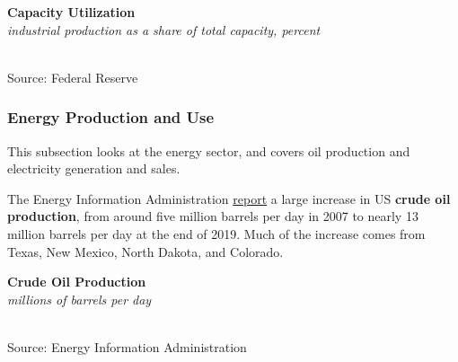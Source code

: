 \documentclass{report}
\makeatletter
\newcommand{\tbllink}[1]{\href{https://raw.githubusercontent.com/bdecon/US-chartbook/master/chartbook/data/#1}{\faTable}}
\newcommand*\short[1]{\expandafter\@gobbletwo\number\numexpr#1\relax}
\newcommand{\abar}[4]{
		\addplot[stack plots=y, area style, draw=none, fill=#1] 
			table [x=#2, y=#3, col sep=comma]{#4}\closedcycle;}
\newcommand{\absnode}[3]{\node[below right, align=left] at (axis cs: #1,#2) {#3};}
\newcommand{\dateaxisticks}{
		date coordinates in=x, axis line style={draw=none},
		xmax={2023-02-15},
		max space between ticks=40,	    
		xtick={{1990-01-01}, {1992-01-01}, {1994-01-01}, 
			{1996-01-01}, {1998-01-01}, {2000-01-01}, 
			{2002-01-01}, {2004-01-01}, {2006-01-01},
			{2008-01-01}, {2010-01-01}, {2012-01-01}, {2014-01-01},
		    {2016-01-01}, {2018-01-01}, {2020-01-01}, {2022-01-01}, 
		    {2024-01-01}, {2026-01-01}},
		minor xtick={{1989-01-01}, {1991-01-01}, {1993-01-01},
			{1995-01-01}, {1997-01-01}, {1999-01-01}, 
			{2001-01-01}, {2003-01-01}, {2005-01-01}, {2007-01-01},
		    {2009-01-01}, {2011-01-01}, {2013-01-01}, {2015-01-01},
		    {2017-01-01}, {2019-01-01}, {2021-01-01}, {2023-01-01}, 
		    {2025-01-01}, {2027-01-01}},
		enlarge y limits={0.06}, enlarge x limits={0.01},
		}
\newcommand{\bbar}[2]{extra #1 ticks = {{#2}}, extra #1 tick labels = ,
		extra #1 tick style = {grid=major, grid style={thick, black!25}},}
\newcommand{\stdline}[4]{\addplot[very thick, no markers, color=#1] 
		table [x=#2, y=#3, col sep=comma] {#4};	}
\newcommand{\thinline}[4]{\addplot[no markers, color=#1] 
		table [x=#2, y=#3, col sep=comma] {#4};	}
\newcommand{\rbars}{
		\fill[color=black!10] (axis cs:{1990-07-01},\pgfkeysvalueof{/pgfplots/ymin}) rectangle 
			(axis cs:{1991-03-01}, \pgfkeysvalueof{/pgfplots/ymax});
		\fill[color=black!10] (axis cs:{2007-12-01},\pgfkeysvalueof{/pgfplots/ymin}) rectangle 
			(axis cs:{2009-07-01}, \pgfkeysvalueof{/pgfplots/ymax});
		\fill[color=black!10] (axis cs:{2001-03-01},\pgfkeysvalueof{/pgfplots/ymin}) rectangle 
			(axis cs:{2001-11-01}, \pgfkeysvalueof{/pgfplots/ymax});
		\fill[color=black!10] (axis cs:{2020-02-01},\pgfkeysvalueof{/pgfplots/ymin}) rectangle 
			(axis cs:{2020-05-01}, \pgfkeysvalueof{/pgfplots/ymax});}
\makeatother
\begin{document}
{\begin{minipage}{0.76\textwidth}
\normalsize \textbf{Capacity Utilization}\\
\footnotesize{\textit{industrial production as a share of total capacity, percent}}\\
\hspace*{-2mm} \\
\footnotesize{Source: Federal Reserve} \hfill \tbllink{tcu.csv}
\end{minipage}
\newpage
\subsubsection*{Energy Production and Use}
\begin{minipage}{0.76\textwidth}
\small This subsection looks at the energy sector, and covers oil production and electricity generation and sales. 

The Energy Information Administration \href{https://www.eia.gov/dnav/pet/pet_crd_crpdn_adc_mbblpd_m.htm}{report} a large increase in US \textbf{crude oil production}, from around five million barrels per day in 2007 to nearly 13 million barrels per day at the end of 2019. Much of the increase comes from Texas, New Mexico, North Dakota, and Colorado. 
\vspace{1mm}

\normalsize \textbf{Crude Oil Production}\\
\footnotesize{\textit{millions of barrels per day}}\\
\hspace*{-2mm} \\
\footnotesize{Source: Energy Information Administration} \hfill \tbllink{oil_prod.csv}
\vspace{8mm}


\end{minipage}}
\end{document}
